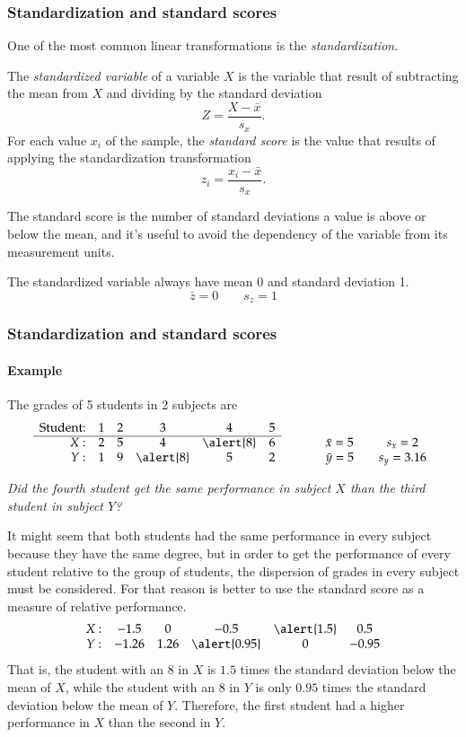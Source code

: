 \begin{frame}
\frametitle{Standardization and standard scores}
One of the most common linear transformations is the \emph{standardization}.
\begin{definition}
The \emph{standardized variable} of a variable $X$ is the variable that result of subtracting the mean from $X$ and
dividing by the standard deviation 
\[
Z=\frac{X-\bar x}{s_{x}}.
\]
For each value $x_i$ of the sample, the \emph{standard score} is the value that results of applying the standardization
transformation
\[
z_i=\frac{x_i-\bar x}{s_{x}}.
\]
\end{definition}

The standard score is the number of standard deviations a value is above or below the mean, and it's useful to avoid
the dependency of the variable from its measurement units.

The standardized variable always have mean 0 and standard deviation 1.  
\[
\bar z = 0 \qquad s_{z} = 1
\]
\end{frame}


\begin{frame}
\frametitle{Standardization and standard scores}
\framesubtitle{Example}
The grades of 5 students in 2 subjects are
\[
\begin{array}{rccccccccc}
\mbox{Student:} & 1 & 2 & 3 & 4 & 5\\ \cline{1-6}
X: & 2 & 5 & 4 & \alert{8} & 6 & \qquad & \bar x = 5 & \quad s_x = 2\\
Y: & 1 & 9 & \alert{8} & 5 & 2 & \qquad & \bar y = 5 & \quad s_y = 3.16\\
\end{array}
\]
\begin{center}
\emph{Did the fourth student get the same performance in subject $X$ than the third student in subject $Y$?}
\end{center}
It might seem that both students had the same performance in every subject because they have the same
degree, but in order to get the performance of every student relative to the group of students, the dispersion
of grades in every subject must be considered.
For that reason is better to use the standard score as a measure of relative performance. 
\[
\begin{array}{cccccc}
X: & -1.5 & 0 & -0.5 & \alert{1.5} & 0.5 \\
Y: & -1.26 & 1.26 & \alert{0.95} & 0 & -0.95\\
\end{array}
\]
That is, the student with an 8 in $X$ is $1.5$ times the standard deviation below the mean of $X$, while the student
with an 8 in $Y$ is only $0.95$ times the standard deviation below the mean of $Y$. 
Therefore, the first student had a higher performance in $X$ than the second in $Y$.
\end{frame}


